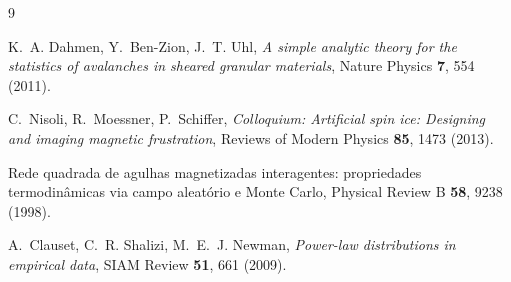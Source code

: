 \documentclass[11pt,a4paper]{article}
\begin{document}
\begin{thebibliography}{9}

K.~A. Dahmen, Y.~Ben-Zion, J.~T. Uhl,
\emph{A simple analytic theory for the statistics of avalanches in
sheared granular materials},
Nature Physics \textbf{7}, 554 (2011).

C.~Nisoli, R.~Moessner, P.~Schiffer,
\emph{Colloquium: Artificial spin ice: Designing and imaging magnetic
frustration},
Reviews of Modern Physics \textbf{85}, 1473 (2013).

Rede quadrada de agulhas magnetizadas interagentes: propriedades
termodinâmicas via campo aleatório e Monte Carlo,
Physical Review B \textbf{58}, 9238 (1998).

A.~Clauset, C.~R. Shalizi, M.~E.~J. Newman,
\emph{Power-law distributions in empirical data},
SIAM Review \textbf{51}, 661 (2009).

\end{thebibliography}
\end{document}
